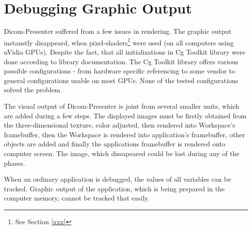 \section{Debugging Graphic Output}
Dicom-Presenter suffered from a few issues in rendering. The graphic output instanstly disappeard, when pixel-shaders\footnote{See Section \ref{xxx}} were used (on all computers using nVidia GPUs). Despite the fact, that all initializations in Cg Toolkit library were done according to library documentation\cite{xxx}. The Cg Toolkit library offers various possible configurations - from hardware specific referencing to some vendor to general configurations usable on most GPUs. None of the tested configurations solved the problem.

The visual output of Dicom-Presenter is joint from several smaller units, which are added during a few steps. The displayed images must be firstly obtained from the three-dimensional texture, color adjusted, then rendered into Workspace's framebuffer, then the Workspace is rendered into application's framebuffer, other objects are added and finally the applications framebuffer is rendered onto computer screen. The image, which dissapeared could be lost during any of the phases.

When an ordinary application is debugged, the values of all variables can be tracked. Graphic output of the application, which is being prepared in the computer memory, cannot be tracked that easily.